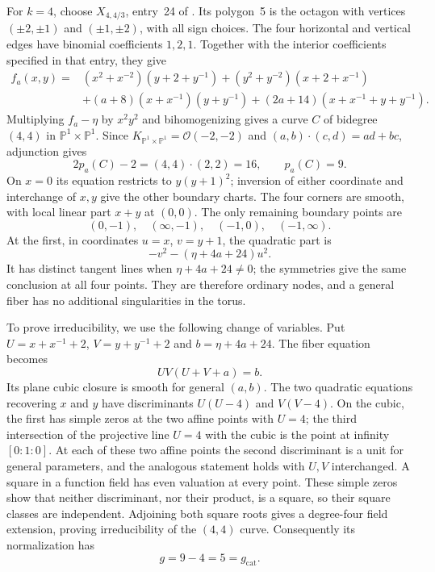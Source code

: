\documentclass[11pt]{article}
\theoremstyle{plain}
\theoremstyle{definition}
\theoremstyle{remark}
\newcommand{\Pj}{\mathbb P}
\newcommand{\1}{\mathbf 1}
\begin{document}
For $k=4$, choose $X_{4,4/3}$, entry~24 of \cite[Section 7.6]{OP}.  Its polygon~5 is the octagon with vertices $(\pm2,\pm1)$ and $(\pm1,\pm2)$, with all sign choices.  The four horizontal and vertical edges have binomial coefficients $1,2,1$.  Together with the interior coefficients specified in that entry, they give
\begin{equation}\label{eq:op-four-polynomial}
\begin{aligned}
f_a(x,y)={}&(x^2+x^{-2})(y+2+y^{-1})
+(y^2+y^{-2})(x+2+x^{-1})\\
&+(a+8)(x+x^{-1})(y+y^{-1})
+(2a+14)(x+x^{-1}+y+y^{-1}).
\end{aligned}
\end{equation}
Multiplying $f_a-\eta$ by $x^2y^2$ and bihomogenizing gives a curve $C$ of bidegree $(4,4)$ in $\Pj^1\times\Pj^1$.  Since $K_{\Pj^1\times\Pj^1}=\mathcal O(-2,-2)$ and $(a,b)\cdot(c,d)=ad+bc$, adjunction gives
\[
2p_a(C)-2=(4,4)\cdot(2,2)=16,
\qquad p_a(C)=9.
\]
On $x=0$ its equation restricts to $y(y+1)^2$; inversion of either coordinate and interchange of $x,y$ give the other boundary charts.  The four corners are smooth, with local linear part $x+y$ at $(0,0)$.  The only remaining boundary points are
\[
(0,-1),\quad(\infty,-1),\quad(-1,0),\quad(-1,\infty).
\]
At the first, in coordinates $u=x$, $v=y+1$, the quadratic part is
\[
-v^2-(\eta+4a+24)u^2.
\]
It has distinct tangent lines when $\eta+4a+24\ne0$; the symmetries give the same conclusion at all four points.  They are therefore ordinary nodes, and a general fiber has no additional singularities in the torus.

To prove irreducibility, we use the following change of variables.  Put $U=x+x^{-1}+2$, $V=y+y^{-1}+2$ and $b=\eta+4a+24$.  The fiber equation becomes
\[
UV(U+V+a)=b.
\]
Its plane cubic closure is smooth for general $(a,b)$.  The two quadratic equations recovering $x$ and $y$ have discriminants $U(U-4)$ and $V(V-4)$.  On the cubic, the first has simple zeros at the two affine points with $U=4$; the third intersection of the projective line $U=4$ with the cubic is the point at infinity $[0:1:0]$.  At each of these two affine points the second discriminant is a unit for general parameters, and the analogous statement holds with $U,V$ interchanged.  A square in a function field has even valuation at every point.  These simple zeros show that neither discriminant, nor their product, is a square, so their square classes are independent.  Adjoining both square roots gives a degree-four field extension, proving irreducibility of the $(4,4)$ curve.  Consequently its normalization has
\[
g=9-4=5=g_{\mathrm{cat}}.
\]
\end{document}
